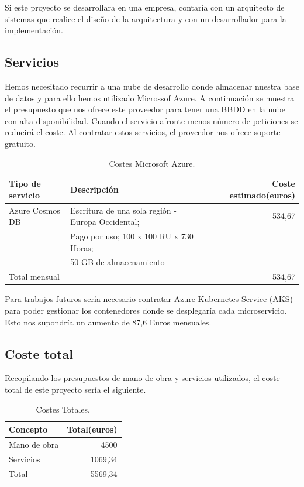 \documentclass[12pt]{report} %
\begin{document}
Si este proyecto se desarrollara en una empresa, contaría con un arquitecto de sistemas que realice el diseño de la arquitectura y con un desarrollador para la implementación.

\subsection{Servicios}
Hemos necesitado recurrir a una nube de desarrollo donde almacenar nuestra base de datos y para ello hemos utilizado Microssof Azure. A continuación se muestra el presupuesto que nos ofrece este proveedor para tener una BBDD en la nube con alta disponibilidad. Cuando el servicio afronte menos número de peticiones se reducirá el coste. Al contratar estos servicios, el proveedor nos ofrece soporte gratuito.

\begin{table}[H]
	\begin{center}
		\begin{tabular}{|l|l|r|}
			\hline
			Tipo de servicio & Descripción & Coste estimado(euros) \\
			\hline \hline
			Azure Cosmos DB & Escritura de una sola región - Europa Occidental; & 534,67 \\ 
			 &  Pago por uso; 100 x 100 RU x 730 Horas; & \\
			 & 50 GB de almacenamiento & \\ \hline
			Total mensual &  & 534,67 \\ \hline
			
		\end{tabular}
		\caption{Costes Microsoft Azure.}
		\label{costeAzure}
	\end{center}
\end{table}

Para trabajos futuros sería necesario contratar Azure Kubernetes Service (AKS) para poder gestionar los contenedores donde se desplegaría cada microservicio. Esto nos supondría un aumento de 87,6 Euros mensuales.

\subsection{Coste total}

Recopilando los presupuestos de mano de obra y servicios utilizados, el coste total de este proyecto sería el siguiente.

\begin{table}[H]
	\begin{center}
		\begin{tabular}{|l|r|}
			\hline
			Concepto & Total(euros) \\
			\hline \hline
			Mano de obra & 4500 \\ \hline
			Servicios & 1069,34 \\ \hline \hline
			Total & 5569,34 \\ \hline					
		\end{tabular}
		\caption{Costes Totales.}
		\label{costeTotal}
	\end{center}
\end{table}
\end{document}
